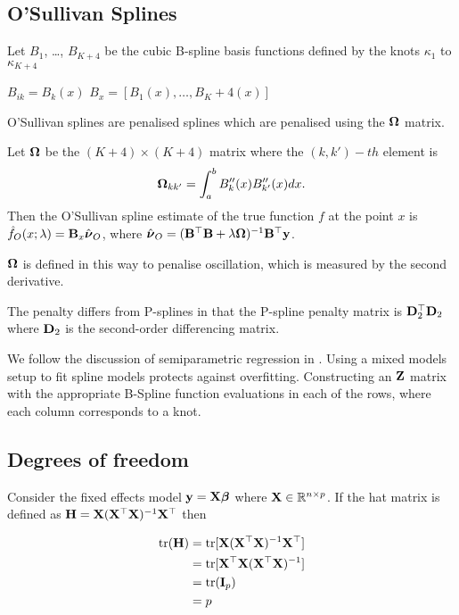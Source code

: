 \documentclass{amsart}[12pt]
\begin{document}
\subsection{O'Sullivan Splines}

Let $B_1$, \ldots, $B_{K+4}$ be the cubic B-spline basis functions defined by the knots $\kappa_1$ to
$\kappa_{K+4}$

$B_{ik} = B_k (x)$
$B_x = [B_1(x), \ldots, B_K+4(x)]$

O'Sullivan splines are penalised splines which are penalised using the ${\boldsymbol \Omega}$ matrix.

Let ${\boldsymbol \Omega}$ be the $(K+4) \times (K+4)$ matrix where the $(k, k')-th$ element is
\[
	{\boldsymbol \Omega}_{k k'} = \int_a^b B''_k(x) B''_{k'}(x) dx.
\]
Then the O'Sullivan spline estimate of the true function $f$ at the point $x$ is
$\hat{f}_O(x; \lambda) = {\bf B}_x \hat{{\boldsymbol \nu}}_O$, where
$\hat{{\boldsymbol \nu}}_O = ({\bf B}^\top {\bf B} + \lambda {\boldsymbol\Omega})^{-1} {\bf B}^\top {\bf y}$.

${\boldsymbol \Omega}$ is defined in this way to penalise oscillation, which is measured by the second derivative.

The penalty differs from P-splines in that the P-spline penalty matrix is ${\bf D}_2^\top {\bf D}_2$ where ${\bf D}_2$ is
the second-order differencing matrix.

We follow the discussion of semiparametric regression in \cite{RuppertWandCarroll}.
Using a mixed models setup to fit spline models protects against overfitting.
Constructing an ${\bf Z}$ matrix with the appropriate B-Spline function evaluations in each of the rows, where
each column corresponds to a knot.

\subsection{Degrees of freedom}


Consider the fixed effects model ${\bf y} = {\bf X} {\boldsymbol \beta}$ where ${\bf X} \in {\mathbb{R}}^{n \times p}$. If the hat matrix is
defined as ${\bf H} = {\bf X} ({\bf X}^\top{\bf X})^{-1} {\bf X}^\top$ then

\begin{align*}
\text{tr}({\bf H}) &= \text{tr}[{\bf X}({\bf X}^\top{\bf X})^{-1}{\bf X}^\top] \\
&= \text{tr}[{\bf X}^\top{\bf X} ({\bf X}^\top{\bf X})^{-1}] \\
&= \text{tr}({\bf I}_p) \\
&= p
\end{align*}
\end{document}
